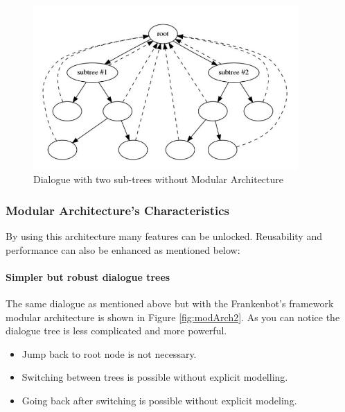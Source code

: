 \begin{figure}[!h]
    \centering
    \includegraphics[width=0.9\textwidth]{img/Modular_Architecture.PNG}
    \caption{Dialogue with two sub-trees without Modular Architecture}
    \label{fig:modArch}
\end{figure}

\subsubsection*{Modular Architecture's Characteristics}
By using this architecture many features can be unlocked. Reusability and performance can also be enhanced as mentioned below:

\paragraph*{Simpler but robust dialogue trees}
The same dialogue as mentioned above but with the Frankenbot's framework modular architecture is shown in Figure \ref{fig:modArch2}. As you can notice the dialogue tree is less complicated and more powerful.
\begin{itemize}
\item Jump back to root node is not necessary.
\item Switching between trees is possible without explicit modelling.       
\item Going back after switching is possible without explicit modeling.
\end{itemize}

